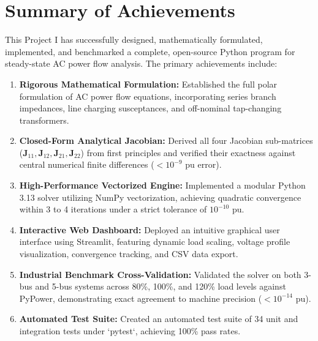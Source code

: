\documentclass[12pt,a4paper,oneside]{report}
\begin{document}
\section{Summary of Achievements}
This Project I has successfully designed, mathematically formulated, implemented, and benchmarked a complete, open-source Python program for steady-state AC power flow analysis. The primary achievements include:
\begin{enumerate}
    \item \textbf{Rigorous Mathematical Formulation:} Established the full polar formulation of AC power flow equations, incorporating series branch impedances, line charging susceptances, and off-nominal tap-changing transformers.
    \item \textbf{Closed-Form Analytical Jacobian:} Derived all four Jacobian sub-matrices ($\mathbf{J}_{11}, \mathbf{J}_{12}, \mathbf{J}_{21}, \mathbf{J}_{22}$) from first principles and verified their exactness against central numerical finite differences ($< 10^{-9}\text{ pu}$ error).
    \item \textbf{High-Performance Vectorized Engine:} Implemented a modular Python 3.13 solver utilizing NumPy vectorization, achieving quadratic convergence within 3 to 4 iterations under a strict tolerance of $10^{-10}\text{ pu}$.
    \item \textbf{Interactive Web Dashboard:} Deployed an intuitive graphical user interface using Streamlit, featuring dynamic load scaling, voltage profile visualization, convergence tracking, and CSV data export.
    \item \textbf{Industrial Benchmark Cross-Validation:} Validated the solver on both 3-bus and 5-bus systems across 80\%, 100\%, and 120\% load levels against PyPower, demonstrating exact agreement to machine precision ($< 10^{-14}\text{ pu}$).
    \item \textbf{Automated Test Suite:} Created an automated test suite of 34 unit and integration tests under `pytest`, achieving 100\% pass rates.
\end{enumerate}
\end{document}
